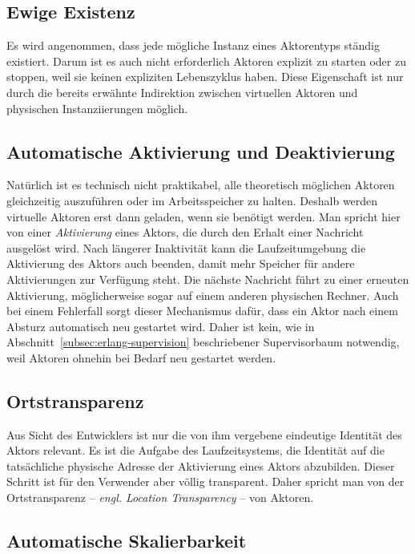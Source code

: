 \subsection{Ewige Existenz}

Es wird angenommen, dass jede mögliche Instanz eines Aktorentyps ständig existiert. Darum ist es auch nicht erforderlich Aktoren explizit zu starten oder zu stoppen, weil sie keinen expliziten Lebenszyklus haben. Diese Eigenschaft ist nur durch die bereits erwähnte Indirektion zwischen virtuellen Aktoren und physischen Instanziierungen möglich.

\subsection{Automatische Aktivierung und Deaktivierung}

Natürlich ist es technisch nicht praktikabel, alle theoretisch möglichen Aktoren gleichzeitig auszuführen oder im Arbeitsspeicher zu halten. Deshalb werden virtuelle Aktoren erst dann geladen, wenn sie benötigt werden. Man spricht hier von einer \textit{Aktivierung} eines Aktors, die \zB durch den Erhalt einer Nachricht ausgelöst wird. Nach längerer Inaktivität kann die Laufzeitumgebung die Aktivierung des Aktors auch beenden, damit mehr Speicher für andere Aktivierungen zur Verfügung steht. Die nächste Nachricht führt zu einer erneuten Aktivierung, möglicherweise sogar auf einem anderen physischen Rechner. Auch bei einem Fehlerfall sorgt dieser Mechanismus dafür, dass ein Aktor nach einem Absturz automatisch neu gestartet wird. Daher ist kein, wie in Abschnitt~\ref{subsec:erlang-supervision} beschriebener Supervisorbaum notwendig, weil Aktoren ohnehin bei Bedarf neu gestartet werden.

\subsection{Ortstransparenz}

Aus Sicht des Entwicklers ist nur die von ihm vergebene eindeutige Identität des Aktors relevant. Es ist die Aufgabe des Laufzeitsystems, die Identität auf die tatsächliche physische Adresse der Aktivierung eines Aktors abzubilden. Dieser Schritt ist für den Verwender aber völlig transparent. Daher spricht man von der Ortstransparenz -- \textit{engl. Location Transparency} -- von Aktoren.

\subsection{Automatische Skalierbarkeit}

